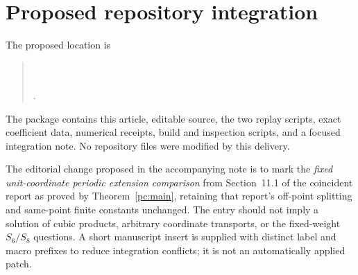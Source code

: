 \documentclass[11pt,a4paper]{article}
\numberwithin{equation}{section}
\theoremstyle{definition}
\begin{document}
\section{Proposed repository integration}\label{pc:integration}
The proposed location is
\begin{quote}\small
{}\\
\\
.
\end{quote}
The package contains this article, editable source, the two replay scripts, exact coefficient data, numerical receipts, build and inspection scripts, and a focused integration note. No repository files were modified by this delivery.

The editorial change proposed in the accompanying note is to mark the \emph{fixed unit-coordinate periodic extension comparison} from Section~11.1 of the coincident report as proved by Theorem~\ref{pc:main}, retaining that report's off-point splitting and same-point finite constants unchanged. The entry should not imply a solution of cubic products, arbitrary coordinate transports, or the fixed-weight $S_6/S_8$ questions. A short manuscript insert is supplied with distinct label and macro prefixes to reduce integration conflicts; it is not an automatically applied patch.
\end{document}
